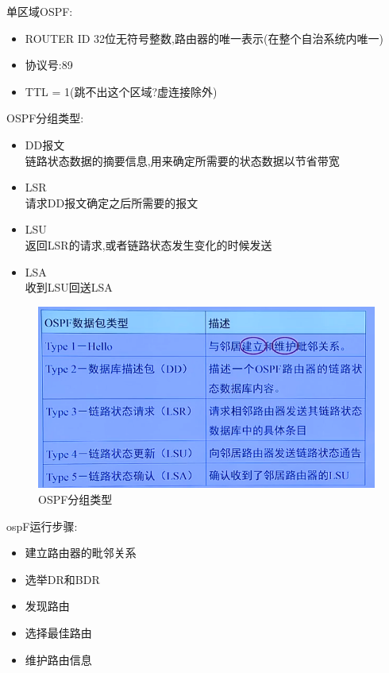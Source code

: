 \documentclass[UTF8,a4paper]{ctexart}
\begin{document}
单区域OSPF:
\begin{itemize}
  \item ROUTER ID 32位无符号整数,路由器的唯一表示(在整个自治系统内唯一)
  \item 协议号:89
  \item TTL = 1(跳不出这个区域?虚连接除外)
\end{itemize}

OSPF分组类型:
\begin{itemize}
  \item DD报文\\
  链路状态数据的摘要信息,用来确定所需要的状态数据以节省带宽
  \item LSR\\
  请求DD报文确定之后所需要的报文
  \item LSU\\
  返回LSR的请求,或者链路状态发生变化的时候发送
  \item LSA\\
  收到LSU回送LSA
\end{itemize}

\begin{figure}[H]
  \centering
  \includegraphics[scale = 0.3]{assets/jisuanjiwangluo_475ff.png}
  \caption{OSPF分组类型}
\end{figure}

ospF运行步骤:
\begin{itemize}
  \item 建立路由器的毗邻关系
  \item 选举DR和BDR
  \item 发现路由
  \item 选择最佳路由
  \item 维护路由信息
\end{itemize}
\end{document}
